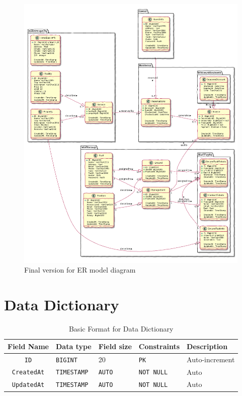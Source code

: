 \begin{figure}[h]
	\centerline
	{\includegraphics[width=16cm]{fig/HotelERD}}
	\caption{Final version for ER model diagram}
\end{figure} 

\section{Data Dictionary}

\begin{table}[H]
	\centering
	\begin{tabular}{cllll}
		\hline
		Field Name & Data type & Field size & Constraints & Description \\ \hline
		\texttt{ID} & \texttt{BIGINT} & 20 & \texttt{PK} & Auto-increment \\
		
		\texttt{CreatedAt} & \texttt{TIMESTAMP} & \texttt{AUTO} & \texttt{NOT NULL} & Auto \\
		\texttt{UpdatedAt} & \texttt{TIMESTAMP} & \texttt{AUTO} & \texttt{NOT NULL} & Auto \\
		\hline
	\end{tabular}
	\caption{Basic Format for Data Dictionary}
\end{table}

